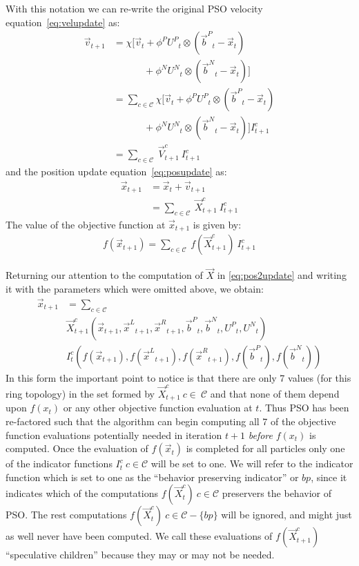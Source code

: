 \documentclass[journal,letterpaper]{IEEEtran}
\providecommand{\pers}{\ensuremath{P}}
\providecommand{\neigh}{\ensuremath{N}}
\providecommand{\leftind}{\ensuremath{L}}
\providecommand{\rightind}{\ensuremath{R}}
\providecommand{\nURand}{\ensuremath{U^\neigh}}
\providecommand{\pURand}{\ensuremath{U^\pers}}
\providecommand{\ppos}{\ensuremath{\Vec{x}}}
\providecommand{\pvel}{\ensuremath{\Vec{v}}}
\providecommand{\nbest}{\ensuremath{\Vec{b}^\neigh}}
\providecommand{\pbest}{\ensuremath{\Vec{b}^\pers}}
\providecommand{\constriction}{\ensuremath{\chi}}
\providecommand{\ncoeff}{\ensuremath{\phi^\neigh}}
\providecommand{\pcoeff}{\ensuremath{\phi^\pers}}
\providecommand{\ofunc}{\ensuremath{f}}
\providecommand{\indic}{\ensuremath{I}}
\providecommand{\specvel}{\ensuremath{\vec{V}}}
\providecommand{\specpos}{\ensuremath{\vec{X}}}
\providecommand{\leftn}{\ensuremath{\Vec{x}^\leftind}}
\providecommand{\rightn}{\ensuremath{\Vec{x}^\rightind}}
\providecommand{\caseset}{\ensuremath{\mathcal{C}}}
\begin{document}
With this notation we can re-write the original PSO velocity
equation~\eqref{eq:velupdate} as:
\begin{align}
\nonumber
	\pvel_{t+1} &=
		\constriction \bigl[ \pvel_t
			+ \pcoeff\pURand_{t}\otimes(\pbest_{t} - \ppos_{t}) \\
\nonumber
			& \quad \quad \quad \, + \ncoeff\nURand_{t}\otimes(\nbest_{t} - \ppos_{t})
		\bigr] \\
\nonumber
	&= \sum_{c \in \caseset} \constriction \bigl[ \pvel_t
			+ \pcoeff\pURand_{t}\otimes(\pbest_{t} - \ppos_{t}) \\
\nonumber
			& \quad \quad \quad \, + \ncoeff\nURand_{t}\otimes(\nbest_{t} - \ppos_{t})
		\bigr] \indic_{t+1}^{c} \\
\label{eq:vel2update}
	&= \sum_{c \in \caseset} \ \specvel_{t+1}^{c} \ \indic_{t+1}^{c}
\end{align}
and the position update 
equation~\eqref{eq:posupdate} as:
\begin{align}
\nonumber
	\ppos_{t+1} &= \ppos_{t} + \pvel_{t+1} \\
\label{eq:pos2update}
	&= \sum_{c \in \caseset} \ \specpos_{t+1}^{c} \ \indic_{t+1}^{c}
\end{align}
The value of the objective function at $\ppos_{t+1}$ is given by:
\begin{align}
\label{eq:val2update}
	\ofunc (\ppos_{t+1}) = \sum_{c \in \caseset} \ \ofunc(\specpos_{t+1}^{c}) \ \indic_{t+1}^{c}
\end{align}

Returning our attention to the computation of $\specpos$ in \eqref{eq:pos2update} and writing it
with the parameters which were omitted above,
we obtain:
\begin{align}
\nonumber
\ppos_{t+1} &= \sum_{c \in \caseset} \\
\nonumber
& \specpos_{t+1}^{c}(\ppos_{t+1},\leftn_{t+1},\rightn_{t+1},
\pbest_{t},\nbest_{t},\pURand_{t}, \nURand_{t}) \\
\label{eq:val2updatelong}
& \indic_{t}^{c}(\ofunc ( \ppos_{t+1} ) ,\ofunc(\leftn_{t+1}),\ofunc(\rightn_{t+1}) ,\ofunc(\pbest_{t}) ,\ofunc(\nbest_{t}))
\end{align}
In this form the important point to notice is that there are only 7 values (for this ring topology) in the set formed by
$\specpos_{t+1}^{c} \ c \in\ \caseset$ and that none of them depend upon $f(x_t)$
or any other objective function evaluation at $t$.
Thus PSO has been re-factored such that the algorithm can begin computing
all 7 of the objective function evaluations potentially needed in iteration $t+1$ \emph{before} $f(x_t)$ is computed.
Once the evaluation of $f(\ppos_{t})$ is completed for all particles only one
of the indicator functions $\indic_{t}^{c} \ c \in \caseset$ will be set to one.
We will refer to the indicator function which is set to one as the
``behavior preserving indicator'' or $bp$, since it indicates which of
the computations $\ofunc(\specpos_{t}^{c}) \  c \in \caseset$ preservers the behavior of PSO.
The rest 
computations $\ofunc(\specpos_{t}^{c}) \ c \in \caseset-\{bp\}$
will be ignored, and might just as well never have been computed.
We call these evaluations of $\ofunc(\specpos_{t+1}^{c})$ ``speculative children''
because they may or may not be needed.
\end{document}
